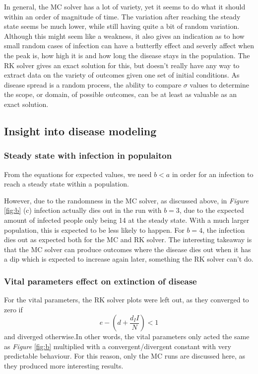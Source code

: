 In general, the MC solver has a lot of variety, yet it seems to do what it should within an order of magnitude of time. 
The variation after reaching the steady state seems be much lower, while still having quite a bit of random variation.
Although this might seem like a weakness, it also gives an indication as to how small random cases of infection can have a butterfly effect and severly affect when the peak is, how high it is and how long the disease stays in the population.
The RK solver gives an exact solution for this, but doesn't really have any way to extract data on the variety of outcomes given one set of initial conditions.
As disease spread is a random process, the ability to compare $\sigma$ values to determine the scope, or domain, of possible outcomes, can be at least as valuable as an exact solution.


\subsection{Insight into disease modeling}

\subsubsection{Steady state with infection in populaiton}

From the equations for expected values, we need $b<a$ in order for an infection to reach a steady state within a population.

However, due to the randomness in the MC solver, as discussed above, in \textit{Figure} \ref{fig:b} (c) infection actually dies out in the run with $b=3$, due to the expected amount of infected people only being 14 at the steady state.
With a much larger population, this is expected to be less likely to happen. For $b=4$, the infection dies out as expected both for the MC and RK solver.
The interesting takeaway is that the MC solver can produce outcomes where the disease dies out when it has a dip which is expected to increase again later, something the RK solver can't do.

\subsubsection{Vital parameters effect on extinction of disease}
For the vital parameters, the RK solver plots were left out, as they converged to zero if
$$
e-(d+\frac{d_I I}{N})<1
$$
and diverged otherwise.In other words, the vital parameters only acted the same as \textit{Figure} \ref{fig:b} multiplied with a convergent/divergent constant with very predictable behaviour.
For this reason, only the MC runs are discussed here, as they produced more interesting results.

